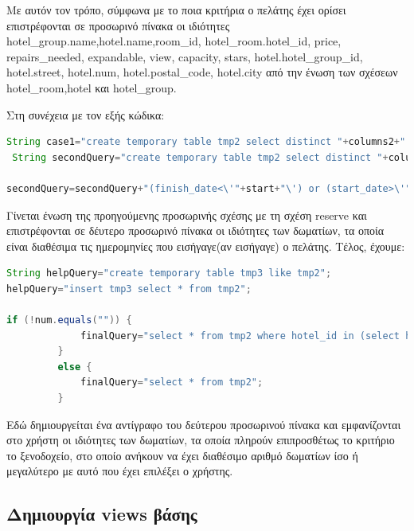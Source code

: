 \documentclass[a4paper,oneside, 11pt]{article}
\begin{document}
Με αυτόν τον τρόπο, σύμφωνα με το ποια κριτήρια ο πελάτης έχει ορίσει επιστρέφονται σε προσωρινό πίνακα οι ιδιότητες  hotel\_group.name,hotel.name,room\_id, hotel\_room.hotel\_id, price, repairs\_needed, expandable, view, capacity, stars, hotel.hotel\_group\_id, hotel.street, hotel.num, hotel.postal\_code, hotel.city από την ένωση των σχέσεων hotel\_room,hotel και hotel\_group.

Στη συνέχεια με τον εξής κώδικα:
\begin{lstlisting}[language=Java]
String case1="create temporary table tmp2 select distinct "+columns2+" from tmp order by "+option+";";
 String secondQuery="create temporary table tmp2 select distinct "+columns2+" from tmp left join reserves on tmp.room_id=reserves.room_id where ( (reserves.room_id is null) or ("; 

secondQuery=secondQuery+"(finish_date<\'"+start+"\') or (start_date>\'"+finish+"\')";

\end{lstlisting}


Γίνεται ένωση της προηγούμενης προσωρινής σχέσης με τη σχέση  reserve και επιστρέφονται σε δέυτερο προσωρινό πίνακα οι ιδιότητες των δωματίων, τα οποία είναι διαθέσιμα τις ημερομηνίες που εισήγαγε(αν εισήγαγε) ο πελάτης. \bigbreak
Τέλος, έχουμε:
\begin{lstlisting}[language=Java]
String helpQuery="create temporary table tmp3 like tmp2";
helpQuery="insert tmp3 select * from tmp2";

if (!num.equals("")) {
   			 finalQuery="select * from tmp2 where hotel_id in (select hotel_id from tmp3 group by hotel_id having count(hotel_id)>="+num+")";
   		 }
   		 else {
   			 finalQuery="select * from tmp2";
   		 }
\end{lstlisting}


Εδώ δημιουργείται ένα αντίγραφο του δεύτερου προσωρινού πίνακα και εμφανίζονται στο χρήστη οι ιδιότητες των δωματίων, τα οποία πληρούν επιπροσθέτως το κριτήριο το ξενοδοχείο, στο οποίο ανήκουν να έχει διαθέσιμο αριθμό δωματίων ίσο ή μεγαλύτερο με αυτό που έχει επιλέξει ο χρήστης.

\subsection{Δημιουργία views βάσης}
\end{document}
